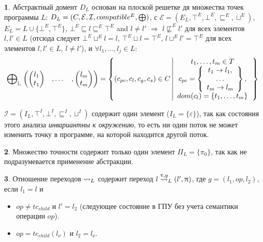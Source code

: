 {\textbf 1.} Абстрактный домент $D_L$ основан на плоской решетке дя множества точек программы $L$: 
$D_L = (C, \mathcal{E}, \mathcal{I}, compatible^E, \mathrel{\bigoplus})$, с $\mathcal{E}=(E_L, \top^E, \bot^E, \sqsubseteq^E, \sqcup^E)$, $E_L= L \cup \{\bot^E,\top^E\}$, $\bot^E \sqsubseteq l \sqsubseteq^E \top^E$ and $l \neq l'$ $\Rightarrow$ $l \not\sqsubseteq^E l'$ для всех элементов $l, l' \in L$ 
(отсюда следует $\bot^E \sqcup^E l = l$, $\top^E \sqcup l=\top^E$, $ l\sqcup^E l' = \top^E$ для всех элементов $l,l'\in L$, $l\neq l'$), 
и
$\forall l_1, \dots, l_j \in L:$
\begin{equation}
\label{location_epp_def}
\begin{aligned}
\mathrel{\bigoplus}_{\mathbb{L}}
\begin{pmatrix}
\begin{pmatrix}
l_1 \\
t_1 
\end{pmatrix}& ,
\dots& ,
\begin{pmatrix}
l_m \\
t_m 
\end{pmatrix}
\end{pmatrix} = 
\left\lbrace (c_{pc},c_l,c_g,c_s) \in C 
\left| 
\begin{array}{c}
t_1, \dots, t_m \in T\\
c_{pc} = 
\left\lbrace
\begin{array}{c}
t_1 \to l_1,\\
\dots\\
t_m \to l_m\\
\end{array}
\right\rbrace, \\
dom(c_l) = \{t_1, \dots, t_m\}\\
\end{array}
\right.
\right\rbrace\\
\end{aligned}
\end{equation}

$\mathcal{I}=(I_L, \top^I, \bot^I, \sqsubseteq^I, \sqcup^I)$ содержит один элемент ($I_L=\{\varepsilon\}$), так как состояния этого анализа {\em инвариантны к окружению}, то есть ни один поток не может изменить точку в программе, на которой находится другой поток.

{\textbf 2.} Множество точности содержит только один элемент $\Pi_L = \{\pi_0\}$, так как не подразумевается применение абстракции.

{\textbf 3.} Отношение переходов $\leadsto_L$ содержит переход $l \stackrel{\uptau, g}{\leadsto}_L (l', \uppi)$, где $g=(l_1,op,l_2)$, если $l_1 = l$ и
\begin{itemize}
\item $op \neq tc_{child}$ и $l' = l_2$ (следующее состояние в ГПУ без учета семантики операции $op$). 
\item $op=tc_{child}(l_\nu)$ и $l_2 = l_\nu$. 
\end{itemize}

